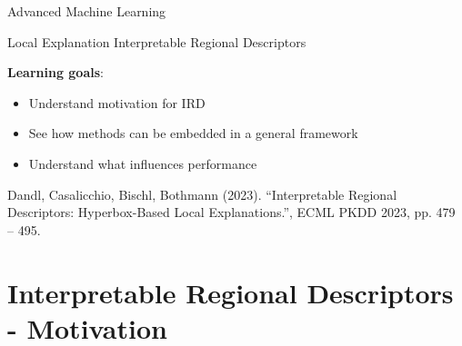 \documentclass[11pt,compress,t,n
otes=noshow, aspectratio=169, xcolor=table]{beamer}
\begin{document}
	
	
	
	
	
	\begin{frame}{Advanced Machine Learning}
			\tableofcontents
	\end{frame}
	
	\begin{frame}{Local Explanation}
		\Large{Interpretable Regional Descriptors}
		
		\small
		
		\vspace{1cm}
		\textbf{Learning goals}: 
		\begin{itemize}
			\item Understand motivation for IRD
			\item See how methods can be embedded in a general framework
			\item Understand what influences performance
		\end{itemize}
	
	\vspace{3cm}
	\footnotesize
	Dandl, Casalicchio, Bischl, Bothmann (2023).
	``Interpretable Regional Descriptors: Hyperbox-Based
	Local Explanations.'', ECML PKDD 2023, pp. 479 -- 495. 
	\end{frame}
	
	
	\section{Interpretable Regional Descriptors - Motivation}
	
	
\end{document}
